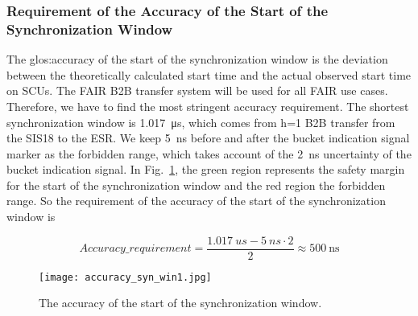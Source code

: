 \subsubsection{Requirement of the Accuracy of the Start of the Synchronization Window}
\label{cal_accuracy}
The \gls{glos:accuracy} of the start of the synchronization window is the deviation between the theoretically calculated start time and the actual observed start time on SCUs. The FAIR B2B transfer system will be used for all FAIR use cases. Therefore, we have to find the most stringent accuracy requirement. The shortest synchronization window is \SI{1.017}{\us}, which comes from h=1 B2B transfer from the SIS18 to the ESR. We keep \SI{5}{ns} before and after the bucket indication signal marker as the forbidden range, which takes account of the \SI{2}{ns} uncertainty of the bucket indication signal. In Fig.~\ref{accuracy_syn_win1}, the green region represents the safety margin for the start of the synchronization window and the red region the forbidden range. So the requirement of the accuracy of the start of the synchronization window is 

\begin{equation}
Accuracy\_requirement=\frac{\SI{1.017}{us}-\SI{5}{ns} \cdot 2}{2} \approx  \SI{500}{\ns}\label{accu}
\end{equation}

\begin{figure}[!htb]
   \centering   
   \texttt{[image: accuracy\_syn\_win1.jpg]}
   \caption{The accuracy of the start of the synchronization window.}
   \label{accuracy_syn_win1}
\end{figure}




